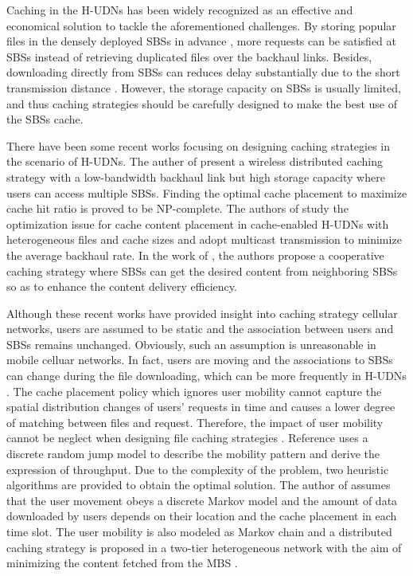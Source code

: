 \documentclass[conference]{IEEEtran}
\begin{document}
Caching in the H-UDNs has been widely recognized as an effective and economical solution to tackle the aforementioned challenges. By storing popular files in the densely deployed SBSs in advance \cite{8269405}, more requests can be satisfied at SBSs instead of retrieving duplicated files over the backhaul links. Besides, downloading directly from SBSs can reduces delay substantially due to the short transmission distance \cite{6736753}. However, the storage capacity on SBSs is usually limited, and thus caching strategies should be carefully designed to make the best use of the SBSs cache.

There have been some recent works focusing on designing caching strategies in the scenario of H-UDNs. The auther of \cite{6600983} present a wireless distributed caching strategy with a low-bandwidth backhaul link but high storage capacity where users can access multiple SBSs. Finding the optimal cache placement to maximize cache hit ratio is proved to be NP-complete. The authors of \cite{6952688} study the optimization issue for cache content placement in cache-enabled H-UDNs with heterogeneous files and cache sizes and adopt multicast transmission to minimize the average backhaul rate. In the work of \cite{8116421}, the authors propose a cooperative caching strategy where SBSs can get the desired content from neighboring SBSs so as to enhance the content delivery efficiency.

Although these recent works have provided insight into caching strategy cellular networks, users are assumed to be static and the association between users and SBSs remains unchanged. Obviously, such an assumption is unreasonable in mobile celluar networks. In fact, users are moving and the associations to SBSs can change during the file downloading, which can be more frequently in H-UDNs \cite{7268835}. The cache placement policy which ignores user mobility cannot capture the spatial distribution changes of users' requests in time and causes a lower degree of matching between files and request. Therefore, the impact of user mobility cannot be neglect when designing file caching strategies \cite{7537180}. Reference \cite{8013789} uses a discrete random jump model to describe the mobility pattern and derive the expression of throughput. Due to the complexity of the problem, two heuristic algorithms are provided to obtain the optimal solution. The author of \cite{6620380} assumes that the user movement obeys a discrete Markov model and the amount of data downloaded by users depends on their location and the cache placement in each time slot. The user mobility is also modeled as Markov chain and a distributed caching strategy is proposed in a two-tier heterogeneous network with the aim of minimizing the content fetched from the MBS \cite{7484297}.
\end{document}
